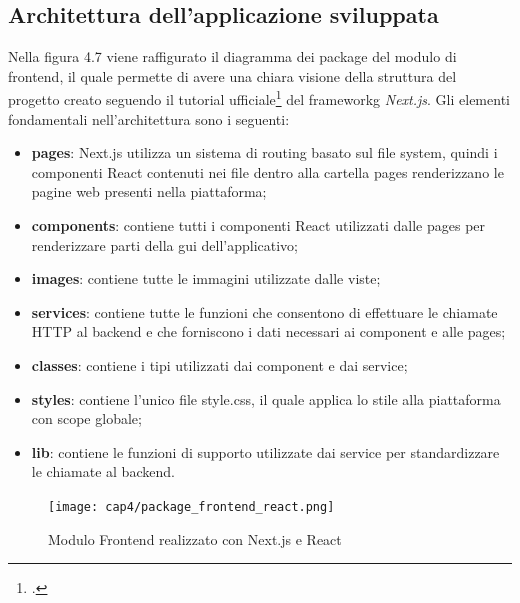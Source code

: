 \subsection{Architettura dell'applicazione sviluppata}
Nella figura 4.7 viene raffigurato il diagramma dei package del modulo di \gls{frontend}, il quale permette di avere una chiara visione della struttura del progetto creato seguendo il tutorial ufficiale\footcite{next-tutorial} del \gls{frameworkg} \textit{Next.js}. Gli elementi fondamentali nell'architettura sono i seguenti:
\begin{itemize}
	\item \textbf{pages}: Next.js utilizza un sistema di routing basato sul file system, quindi i componenti React contenuti nei file dentro alla cartella pages renderizzano le pagine web presenti nella piattaforma;
	\item \textbf{components}: contiene tutti i componenti React utilizzati dalle pages per renderizzare parti della \gls{gui} dell'applicativo;
	\item \textbf{images}: contiene tutte le immagini utilizzate dalle viste;
	\item \textbf{services}: contiene tutte le funzioni che consentono di effettuare le chiamate HTTP al \gls{backend} e che forniscono i dati necessari ai component e alle pages;
	\item \textbf{classes}: contiene i tipi utilizzati dai component e dai service;
	\item \textbf{styles}: contiene l'unico file style.css, il quale applica lo stile alla piattaforma con scope globale;
	\item \textbf{lib}: contiene le funzioni di supporto utilizzate dai service per standardizzare le chiamate al \gls{backend}.
\end{itemize}
\begin{figure}[!h] 
    \centering 
    \texttt{[image: cap4/package\_frontend\_react.png]} 
    \caption{Modulo Frontend realizzato con Next.js e React}
\end{figure}

